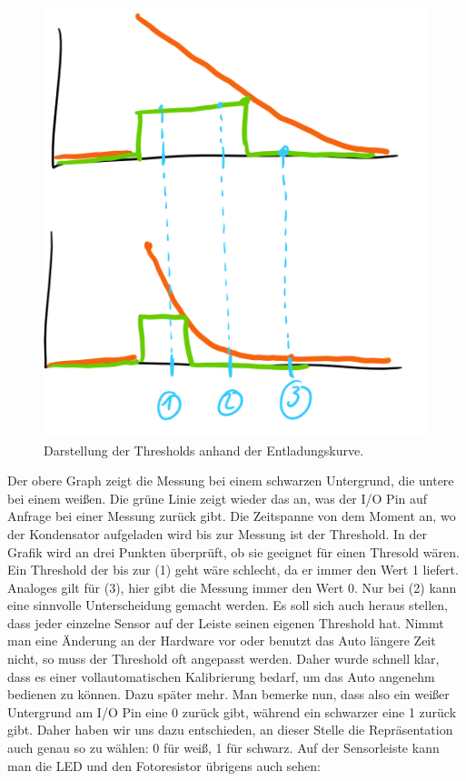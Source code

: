 	  	\begin{figure}[H]
	  	\centering
	  	\label{thresholds}
	  	\includegraphics[scale=0.5]{img/Sensor/Kurve3.png}
	  	\caption{Darstellung der Thresholds anhand der Entladungskurve.}
	  \end{figure}

	  
	  Der obere Graph zeigt die Messung bei einem schwarzen Untergrund, die untere bei einem weißen. Die grüne Linie zeigt wieder das an, was der I/O Pin auf Anfrage bei einer Messung zurück gibt. Die Zeitspanne von dem Moment an, wo der Kondensator aufgeladen wird bis zur Messung ist der Threshold. In der Grafik wird an drei Punkten überprüft, ob sie geeignet für einen Thresold wären. Ein Threshold der bis zur (1) geht wäre schlecht, da er immer den Wert 1 liefert. Analoges gilt für (3), hier gibt die Messung immer den Wert 0. Nur bei (2) kann eine sinnvolle Unterscheidung gemacht werden. Es soll sich auch heraus stellen, dass jeder einzelne Sensor auf der Leiste seinen eigenen Threshold hat. Nimmt man eine Änderung an der Hardware vor oder  benutzt das Auto längere Zeit nicht, so muss der Threshold oft angepasst werden. Daher wurde schnell klar, dass es einer vollautomatischen Kalibrierung bedarf, um das Auto angenehm bedienen zu können. Dazu später mehr. Man bemerke nun, dass also ein weißer Untergrund am I/O Pin eine 0 zurück gibt, während ein schwarzer eine 1 zurück gibt. Daher haben wir uns dazu entschieden, an dieser Stelle die Repräsentation auch genau so zu wählen: 0 für weiß, 1 für schwarz.
	  \newpage
	  Auf der Sensorleiste kann man die LED und den Fotoresistor übrigens auch sehen:
	  
